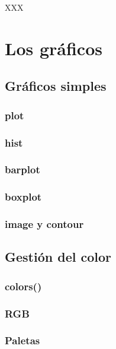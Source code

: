 \documentclass[]{book}
\begin{document}
XXX

\part{Los gráficos}\label{part-los-graficos}

\chapter{Gráficos simples}\label{graph1}

\section{plot}\label{plot}

\section{hist}\label{hist}

\section{barplot}\label{barplot}

\section{boxplot}\label{boxplot}

\section{image y contour}\label{image-y-contour}

\chapter{Gestión del color}\label{graph2}

\section{colors()}\label{colors}

\section{RGB}\label{rgb}

\section{Paletas}\label{paletas}
\end{document}
